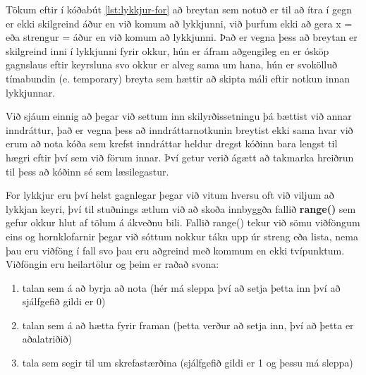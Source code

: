 Tökum eftir í kóðabút \ref{lst:lykkjur-for} að breytan sem notuð er til að ítra í gegn er ekki skilgreind áður en við komum að lykkjunni, við þurfum ekki að gera x =  eða strengur = áður en við komum að lykkjunni.
Það er vegna þess að breytan er skilgreind inni í lykkjunni fyrir okkur, hún er áfram aðgengileg en er ósköp gagnslaus eftir keyrsluna svo okkur er alveg sama um hana, hún er svokölluð tímabundin (e. temporary) breyta sem hættir að skipta máli eftir notkun innan lykkjunnar.

Við sjáum einnig að þegar við settum inn skilyrðissetningu þá bættist við annar inndráttur, það er vegna þess að inndráttarnotkunin breytist ekki sama hvar við erum að nota kóða sem krefst inndráttar heldur dregst kóðinn bara lengst til hægri eftir því sem við förum innar. 
Því getur verið ágætt að takmarka hreiðrun til þess að kóðinn sé sem læsilegastur.

For lykkjur eru því helst gagnlegar þegar við vitum hversu oft við viljum að lykkjan keyri, því til stuðnings ætlum við að skoða innbyggða fallið \textbf{range()} sem gefur okkur hlut af tölum á ákveðnu bili.
Fallið range() tekur við sömu viðföngum eins og hornklofarnir þegar við sóttum nokkur tákn upp úr streng eða lista, nema þau eru viðföng í fall svo þau eru aðgreind með kommum en ekki tvípunktum.
Viðföngin eru heilartölur og þeim er raðað svona:

\begin{enumerate}
	\item talan sem á að byrja að nota (hér má sleppa því að setja þetta inn því að sjálfgefið gildi er 0)
	\item talan sem á að hætta fyrir framan (þetta verður að setja inn, því að þetta er aðalatriðið)
	\item tala sem segir til um skrefastærðina (sjálfgefið gildi er 1 og þessu má sleppa)
\end{enumerate}

